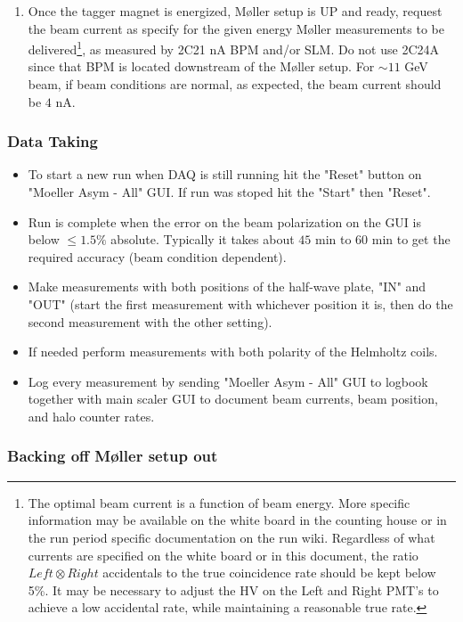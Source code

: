 \begin{enumerate}
\begin{enumerate}
\end{enumerate}
%

\item Once the tagger magnet is energized, M{\o}ller setup is UP and ready, request the beam current as specify for the given energy M{\o}ller measurements to be delivered\footnote{The optimal beam current is a function of beam energy.
More specific information may be available on the white board in the
counting house or in the run period specific documentation on the run wiki. Regardless
of what currents are specified on the white board or in this document,
the ratio $Left\otimes Right$ accidentals to the true coincidence
rate should be kept below 5\%. It may be necessary to adjust the
HV on the Left and Right PMT's to achieve a low accidental rate, while
maintaining a reasonable true rate.}, 
as measured by 2C21 nA BPM and/or SLM. Do
not use 2C24A since that BPM is located downstream of the M{\o}ller setup. For $\sim 11$ GeV beam, if beam conditions are normal, as expected, the beam current should be $4$ nA. 

\end{enumerate}

\subsubsection{Data Taking}
\indent
\begin{itemize}
\item 
To start a new run when DAQ is still running hit the "Reset" button on "Moeller Asym - All" GUI. If run was stoped hit the "Start" then "Reset". 
\item Run is complete when the error on the beam polarization on the GUI is below $\le 1.5\%$ absolute. Typically it takes about $45$ min to $60$ min to get the required accuracy (beam condition dependent). 
\item Make measurements with both positions of the half-wave plate,  "IN" and "OUT" (start the first measurement with whichever position it is, then do the second measurement with the other setting). 
\item If needed perform measurements with both polarity of the Helmholtz coils. 
\item Log every measurement by sending "Moeller Asym - All" GUI to logbook together with main scaler GUI to document beam currents, beam position, and halo counter rates. 
\end{itemize}

\subsubsection{Backing off M{\o}ller setup out\label{moller cblose out}}

